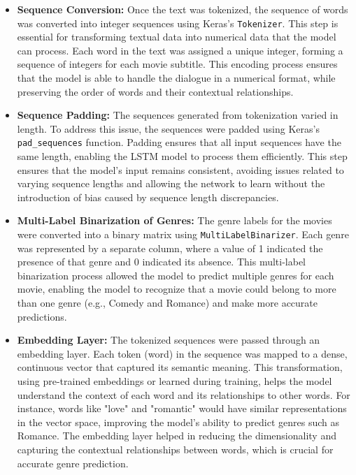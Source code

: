 \documentclass[conference]{IEEEtran}
\begin{document}
\begin{itemize}
    \item \textbf{Sequence Conversion:} Once the text was tokenized, the sequence of words was converted into integer sequences using Keras’s \texttt{Tokenizer}. This step is essential for transforming textual data into numerical data that the model can process. Each word in the text was assigned a unique integer, forming a sequence of integers for each movie subtitle. This encoding process ensures that the model is able to handle the dialogue in a numerical format, while preserving the order of words and their contextual relationships.

    \item \textbf{Sequence Padding:} The sequences generated from tokenization varied in length. To address this issue, the sequences were padded using Keras’s \texttt{pad\_sequences} function. Padding ensures that all input sequences have the same length, enabling the LSTM model to process them efficiently. This step ensures that the model's input remains consistent, avoiding issues related to varying sequence lengths and allowing the network to learn without the introduction of bias caused by sequence length discrepancies.

    \item \textbf{Multi-Label Binarization of Genres:} The genre labels for the movies were converted into a binary matrix using \texttt{MultiLabelBinarizer}. Each genre was represented by a separate column, where a value of 1 indicated the presence of that genre and 0 indicated its absence. This multi-label binarization process allowed the model to predict multiple genres for each movie, enabling the model to recognize that a movie could belong to more than one genre (e.g., Comedy and Romance) and make more accurate predictions.

    \item \textbf{Embedding Layer:} The tokenized sequences were passed through an embedding layer. Each token (word) in the sequence was mapped to a dense, continuous vector that captured its semantic meaning. This transformation, using pre-trained embeddings or learned during training, helps the model understand the context of each word and its relationships to other words. For instance, words like "love" and "romantic" would have similar representations in the vector space, improving the model's ability to predict genres such as Romance. The embedding layer helped in reducing the dimensionality and capturing the contextual relationships between words, which is crucial for accurate genre prediction.


\end{itemize}
\end{document}
